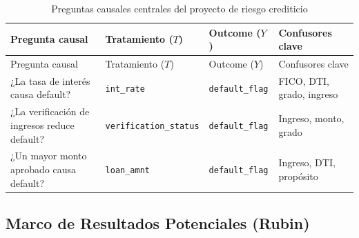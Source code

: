 \documentclass[
  spanish,
  11pt,
  letterpaper,
]{scrbook}
\theoremstyle{plain}
\theoremstyle{remark}
\begin{document}
\begin{longtable}[]{@{}
  >{\raggedright\arraybackslash}p{}
  >{\raggedright\arraybackslash}p{}
  >{\raggedright\arraybackslash}p{}
  >{\raggedright\arraybackslash}p{}@{}}
\caption{Preguntas causales centrales del proyecto de riesgo
crediticio}\label{tbl-causal-questions}\tabularnewline
\toprule\noalign{}
\begin{minipage}[b]{\linewidth}\raggedright
Pregunta causal
\end{minipage} & \begin{minipage}[b]{\linewidth}\raggedright
Tratamiento (\(T\))
\end{minipage} & \begin{minipage}[b]{\linewidth}\raggedright
Outcome (\(Y\))
\end{minipage} & \begin{minipage}[b]{\linewidth}\raggedright
Confusores clave
\end{minipage} \\
\midrule\noalign{}
\endfirsthead
\toprule\noalign{}
\begin{minipage}[b]{\linewidth}\raggedright
Pregunta causal
\end{minipage} & \begin{minipage}[b]{\linewidth}\raggedright
Tratamiento (\(T\))
\end{minipage} & \begin{minipage}[b]{\linewidth}\raggedright
Outcome (\(Y\))
\end{minipage} & \begin{minipage}[b]{\linewidth}\raggedright
Confusores clave
\end{minipage} \\
\midrule\noalign{}
\endhead
\bottomrule\noalign{}
\endlastfoot
¿La tasa de interés causa default? & \texttt{int\_rate} &
\texttt{default\_flag} & FICO, DTI, grado, ingreso \\
¿La verificación de ingresos reduce default? &
\texttt{verification\_status} & \texttt{default\_flag} & Ingreso, monto,
grado \\
¿Un mayor monto aprobado causa default? & \texttt{loan\_amnt} &
\texttt{default\_flag} & Ingreso, DTI, propósito \\
\end{longtable}

\subsection{Marco de Resultados Potenciales
(Rubin)}\label{sec-potential-outcomes}
\end{document}
